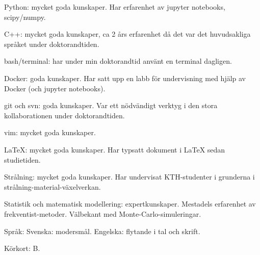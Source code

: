 



\begin{cvskills}



\cvskill
{Python:}
{mycket goda kunskaper. Har erfarenhet av jupyter notebooks, scipy/numpy.}

\cvskill
{C++:}
{mycket goda kunskaper, ca 2 års erfarenhet då det var det huvudsakliga språket under doktorandtiden.}

\cvskill
{bash/terminal:}
{har under min doktorandtid anv{\"a}nt en terminal dagligen.}

\cvskill
{Docker:} 
{goda kunskaper. Har satt upp en labb f{\"o}r undervisning med hj{\"a}lp av Docker (och jupyter notebooks).}

\cvskill
{git och svn:}
{goda kunskaper. Var ett n{\"o}dv{\"a}ndigt verktyg i den stora kollaborationen under doktorandtiden.}

\cvskill
{vim:}
{mycket goda kunskaper.}

\cvskill
{LaTeX:}
{mycket goda kunskaper. Har typsatt dokument i LaTeX sedan studietiden.}

\cvskill
{Strålning:}
{mycket goda kunskaper. Har undervisat KTH-studenter i grunderna i strålning-material-växelverkan.}

\cvskill
{Statistik och} {}
\cvskill
{matematisk modellering:}
{expertkunskaper. Mestadels erfarenhet av frekventist-metoder. V{\"a}lbekant med Monte-Carlo-simuleringar.}

\cvskill
{Spr{\aa}k:}
{Svenska: modersm{\aa}l. Engelska: flytande i tal och skrift.}

\cvskill
{Körkort:}
{B.}


\end{cvskills}